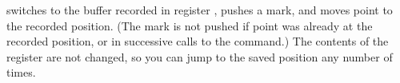 \message{ !name(emacs.tex)}\documentclass[a4paper,10pt]{book}
\begin{document}
 switches to the buffer recorded in register , pushes a mark, and moves point to the recorded position.
(The mark is not pushed if point was already at the recorded position, or in successive calls to the command.)
The contents of the register are not changed, so you can jump to the saved position any number of times.



\end{document}
